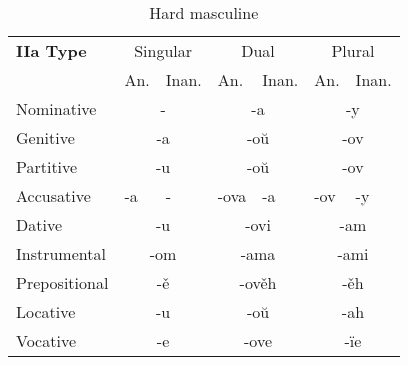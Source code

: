 \begin{table}[!htb]
	\caption{Hard masculine}
	\begin{tabular}{lllllll}
		\textbf{IIa Type}       
		& \multicolumn{2}{c}{Singular} 
		& \multicolumn{2}{c}{Dual} 
		& \multicolumn{2}{c}{Plural} \\
		& An.   & Inan.  & An.   & Inan.   & An.  & Inan. \\
		Nominative    & \multicolumn{2}{c}{-}      
		& \multicolumn{2}{c}{-a}        
		& \multicolumn{2}{c}{-y} \\
		Genitive      & \multicolumn{2}{c}{-a}       
		& \multicolumn{2}{c}{-oŭ}      
		& \multicolumn{2}{c}{-ov}   \\
		Partitive     & \multicolumn{2}{c}{-u}       
		& \multicolumn{2}{c}{-oŭ}      
		& \multicolumn{2}{c}{-ov} \\
		Accusative    & -a & -      
		& -ova & -a 
		& -ov & -y \\
		Dative        & \multicolumn{2}{c}{-u}       
		& \multicolumn{2}{c}{-ovi}     
		& \multicolumn{2}{c}{-am} \\
		Instrumental  & \multicolumn{2}{c}{-om}     
		& \multicolumn{2}{c}{-ama}     
		& \multicolumn{2}{c}{-ami} \\
		Prepositional & \multicolumn{2}{c}{-ě}       
		& \multicolumn{2}{c}{-ověh}     
		& \multicolumn{2}{c}{-ěh} \\
		Locative      & \multicolumn{2}{c}{-u}      
		& \multicolumn{2}{c}{-oŭ}       
		& \multicolumn{2}{c}{-ah} \\ 
		Vocative      & \multicolumn{2}{c}{-e}       
		& \multicolumn{2}{c}{-ove}      
		& \multicolumn{2}{c}{-ïe}
	\end{tabular}
\end{table}



